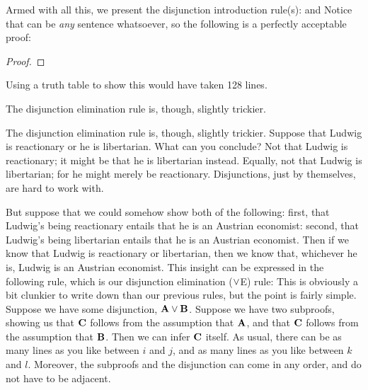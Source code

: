 Armed with all this, we present the disjunction introduction rule(s):
and
Notice that  can be \emph{any} sentence whatsoever, so the following is a perfectly acceptable proof:
\begin{proof}
\end{proof}
Using a truth table to show this would have taken 128 lines.

The disjunction elimination rule is, though, slightly trickier. 

The disjunction elimination rule is, though, slightly trickier. Suppose that  Ludwig is reactionary or he is libertarian. What can you conclude? Not that Ludwig is reactionary; it might be that he is libertarian instead. Equally, not that Ludwig is libertarian; for he might merely be reactionary. Disjunctions, just by themselves, are hard to work with. 

But suppose that we could somehow show both of the following: first, that Ludwig's being reactionary entails that he is an Austrian economist: second, that Ludwig's being libertarian entails that he is an Austrian economist. Then if we know that Ludwig is reactionary or libertarian, then we know that, whichever he is, Ludwig is an Austrian economist. This insight can be expressed in the following rule, which is our disjunction elimination ($\vee$E) rule:
This is obviously a bit clunkier to write down than our previous rules, but the point is fairly simple. Suppose we have some disjunction, $\mathbf{A} \vee \mathbf{B}$. Suppose we have two subproofs, showing us that $\mathbf{C}$ follows from the assumption that $\mathbf{A}$, and that $\mathbf{C}$ follows from the assumption that $\mathbf{B}$. Then we can infer $\mathbf{C}$ itself. As usual, there can be as many lines as you like between $i$ and $j$, and as many lines as you like between $k$ and $l$. Moreover, the subproofs and the disjunction can come in any order, and do not have to be adjacent.

